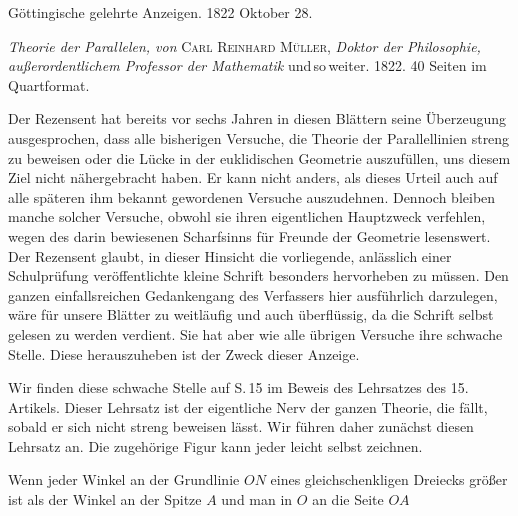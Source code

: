 \clearpage{}
\begin{center}
{\Large{}}
\end{center}

\bigskip
\noindent\hrulefill

\begin{center}
Göttingische gelehrte Anzeigen. 1822 Oktober 28.
\end{center}

\noindent\hrulefill
\bigskip

\begin{center}
\end{center}

\emph{Theorie der Parallelen, von} \textsc{Carl Reinhard Müller}, \emph{Doktor der Philosophie, außerordentlichem Professor der Mathematik} und\,so\,weiter. 1822. 40 Seiten im Quartformat.

Der Rezensent hat bereits vor sechs Jahren in diesen Blättern seine Überzeugung ausgesprochen, dass alle bisherigen Versuche, die Theorie der Parallellinien streng zu beweisen oder die Lücke in der euklidischen Geometrie auszufüllen, uns diesem Ziel nicht nähergebracht haben. Er kann nicht anders, als dieses Urteil auch auf alle späteren ihm bekannt gewordenen Versuche auszudehnen. Dennoch bleiben manche solcher Versuche, obwohl sie ihren eigentlichen Hauptzweck verfehlen, wegen des darin bewiesenen Scharfsinns für Freunde der Geometrie lesenswert. Der Rezensent glaubt, in dieser Hinsicht die vorliegende, anlässlich einer Schulprüfung veröffentlichte kleine Schrift besonders hervorheben zu müssen. Den ganzen einfallsreichen Gedankengang des Verfassers hier ausführlich darzulegen, wäre für unsere Blätter zu weitläufig und auch überflüssig, da die Schrift selbst gelesen zu werden verdient. Sie hat aber wie alle übrigen Versuche ihre schwache Stelle. Diese herauszuheben ist der Zweck dieser Anzeige.

Wir finden diese schwache Stelle auf S.\,15 im Beweis des Lehrsatzes des 15. Artikels. Dieser Lehrsatz ist der eigentliche Nerv der ganzen Theorie, die fällt, sobald er sich nicht streng beweisen lässt. Wir führen daher zunächst diesen Lehrsatz an. Die zugehörige Figur kann jeder leicht selbst zeichnen.

Wenn jeder Winkel an der Grundlinie $ON$ eines gleichschenkligen Dreiecks größer ist als der Winkel an der Spitze $A$ und man in $O$ an die Seite $OA$
